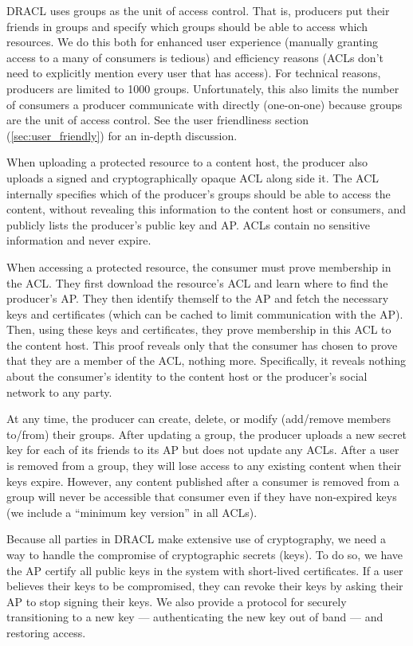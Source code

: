\documentclass[pdftex,12pt,a4papaer,twoside,notitlepage]{report}
\begin{document}
DRACL uses groups as the unit of access control. That is, producers put their
friends in groups and specify which groups should be able to access which
resources. We do this both for enhanced user experience (manually granting
access to a many of consumers is tedious) and efficiency reasons (ACLs don't
need to explicitly mention every user that has access). For technical reasons,
producers are limited to 1000 groups. Unfortunately, this also limits the number
of consumers a producer communicate with directly (one-on-one) because groups
are the unit of access control. See the user friendliness section
(\cref{sec:user_friendly}) for an in-depth discussion.

When uploading a protected resource to a content host, the producer also uploads
a signed and cryptographically opaque ACL along side it. The ACL internally
specifies which of the producer's groups should be able to access the content,
without revealing this information to the content host or consumers, and
publicly lists the producer's public key and AP. ACLs contain no sensitive
information and never expire.

When accessing a protected resource, the consumer must prove membership in the
ACL. They first download the resource's ACL and learn where to find the
producer's AP. They then identify themself to the AP and fetch the necessary
keys and certificates (which can be cached to limit communication with the AP).
Then, using these keys and certificates, they prove membership in this ACL to
the content host. This proof reveals only that the consumer has chosen to prove
that they are a member of the ACL, nothing more. Specifically, it reveals
nothing about the consumer's identity to the content host or the producer's
social network to any party.

At any time, the producer can create, delete, or modify (add/remove members
to/from) their groups. After updating a group, the producer uploads a new secret
key for each of its friends to its AP but does not update any ACLs. After a user
is removed from a group, they will lose access to any existing content when
their keys expire. However, any content published after a consumer is removed
from a group will never be accessible that consumer even if they have
non-expired keys (we include a ``minimum key version'' in all ACLs).

Because all parties in DRACL make extensive use of cryptography, we need a way
to handle the compromise of cryptographic secrets (keys). To do so, we have the
AP certify all public keys in the system with short-lived certificates. If a
user believes their keys to be compromised, they can revoke their keys by asking
their AP to stop signing their keys. We also provide a protocol for securely
transitioning to a new key --- authenticating the new key out of band --- and
restoring access.
\end{document}
